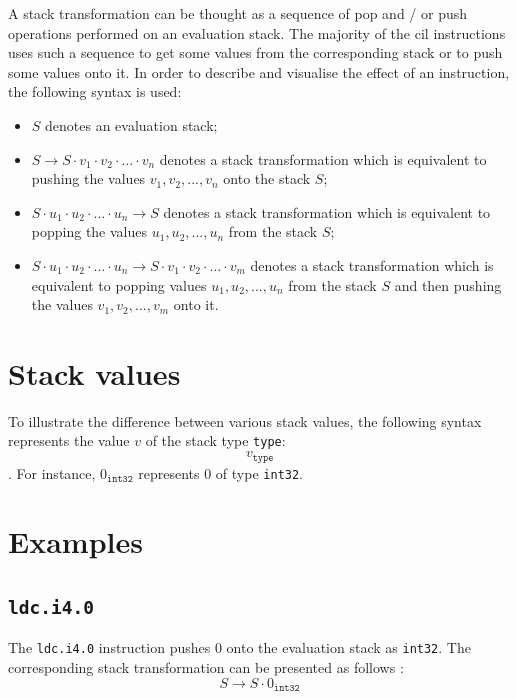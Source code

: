 \documentclass[declaration,shortabstract,english,mgr]{iithesis}
\newcommand{\sval}[2] {
	#1_\texttt{#2}
}
\begin{document}
A stack transformation can be thought as a sequence of pop and / or push operations performed on an evaluation stack. The majority of the \acrshort{cil} instructions uses such a sequence to get some values from the corresponding stack or to push some values onto it. In order to describe and visualise the effect of an instruction, the following syntax is used:
\begin{itemize}
	\item{$S$ denotes an evaluation stack;}
	\item{$S \rightarrow S \cdot v_1 \cdot v_2 \cdot ... \cdot v_n$ denotes a stack transformation which is equivalent to pushing the values $v_1, v_2, ..., v_n$ onto the stack $S$;}
	\item{$S \cdot u_1 \cdot u_2 \cdot ... \cdot u_n \rightarrow S$ denotes a stack transformation which is equivalent to popping the values $u_1, u_2, ..., u_n$ from the stack $S$;}
	\item{$S \cdot u_1 \cdot u_2 \cdot ... \cdot u_n \rightarrow S \cdot v_1 \cdot v_2 \cdot ... \cdot v_m$ denotes a stack transformation which is equivalent to popping values $u_1, u_2, ..., u_n$ from the stack $S$ and then pushing the values $v_1, v_2, ..., v_m$ onto it.}
\end{itemize}

\section{Stack values}

To illustrate the difference between various stack values, the following syntax represents the value $v$ of the stack type \texttt{type}:
$$
	\sval{v}{type}
$$.
For instance, $\sval{0}{int32}$ represents $0$ of type \texttt{int32}.

\section{Examples}
\label{sec:instruction_examples}

\subsection{\texttt{ldc.i4.0}}
\label{sec:desc_ldci40}

The \texttt{ldc.i4.0} instruction pushes $0$ onto the evaluation stack as \texttt{int32}. The corresponding stack transformation can be presented as follows \cite{ecmaStandard}:
$$
	S \rightarrow S \cdot 0_\texttt{int32}
$$
\end{document}
